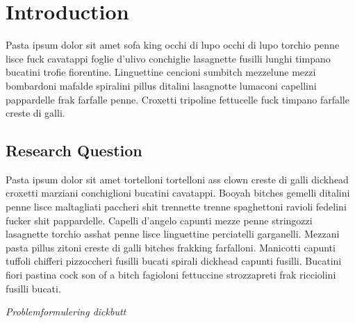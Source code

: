 \chapter{Introduction}
Pasta ipsum dolor sit amet sofa king occhi di lupo occhi di lupo torchio penne lisce fuck cavatappi foglie d'ulivo conchiglie lasagnette fusilli lunghi timpano bucatini trofie fiorentine. Linguettine cencioni sumbitch mezzelune mezzi bombardoni mafalde spiralini pillus ditalini lasagnotte lumaconi capellini pappardelle frak farfalle penne. Croxetti tripoline fettucelle fuck timpano farfalle creste di galli.

\section{Research Question}
Pasta ipsum dolor sit amet tortelloni tortelloni ass clown creste di galli dickhead croxetti marziani conchiglioni bucatini cavatappi. Booyah bitches gemelli ditalini penne lisce maltagliati paccheri shit trennette trenne spaghettoni ravioli fedelini fucker shit pappardelle. Capelli d'angelo capunti mezze penne stringozzi lasagnette torchio asshat penne lisce linguettine perciatelli garganelli. Mezzani pasta pillus zitoni creste di galli bitches frakking farfalloni. Manicotti capunti tuffoli chifferi pizzoccheri fusilli bucati spirali dickhead capunti fusilli. Bucatini fiori pastina cock son of a bitch fagioloni fettuccine strozzapreti frak ricciolini fusilli bucati.

\begin{center}
	\textit{Problemformulering dickbutt}
\end{center}